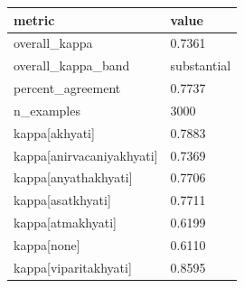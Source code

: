 {\def\LTcaptype{none} %
\begin{longtable}[]{@{}ll@{}}
\toprule\noalign{}
metric & value \\
\midrule\noalign{}
\endhead
\bottomrule\noalign{}
\endlastfoot
overall\_kappa & 0.7361 \\
overall\_kappa\_band & substantial \\
percent\_agreement & 0.7737 \\
n\_examples & 3000 \\
kappa{[}akhyati{]} & 0.7883 \\
kappa{[}anirvacaniyakhyati{]} & 0.7369 \\
kappa{[}anyathakhyati{]} & 0.7706 \\
kappa{[}asatkhyati{]} & 0.7711 \\
kappa{[}atmakhyati{]} & 0.6199 \\
kappa{[}none{]} & 0.6110 \\
kappa{[}viparitakhyati{]} & 0.8595 \\
\end{longtable}
}

